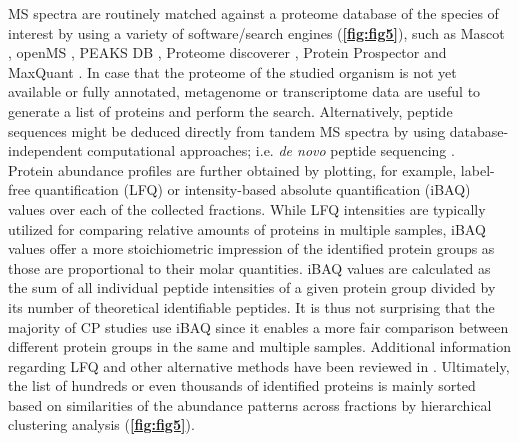 MS spectra are routinely matched against a proteome database of the species of interest by using a variety of software/search engines (\textbf{\autoref{fig:fig5}}), such as Mascot \cite{Perkins_1999}, openMS \cite{Rost_2016}, PEAKS DB \cite{Zhang_2012}, Proteome discoverer \cite{Orsburn_2021}, Protein Prospector \cite{Chalkley_2005} and MaxQuant \cite{Tyanova_2016a}. In case that the proteome of the studied organism is not yet available or fully annotated, metagenome or transcriptome data are useful to generate a list of proteins and perform the search. Alternatively, peptide sequences might be deduced directly from tandem MS spectra by using database-independent computational approaches; i.e. \emph{de novo} peptide sequencing \cite{Tran_2017}.\\
Protein abundance profiles are further obtained by plotting, for example, label-free quantification (LFQ) \cite{Cox_2014} or intensity-based absolute quantification (iBAQ) \cite{Schwanhausser_2011, Tyanova_2016a} values over each of the collected fractions. While LFQ intensities are typically utilized for comparing relative amounts of proteins in multiple samples, iBAQ values offer a more stoichiometric impression of the identified protein groups as those are proportional to their molar quantities. iBAQ values are calculated as the sum of all individual peptide intensities of a given protein group divided by its number of theoretical identifiable peptides. It is thus not surprising that the majority of CP studies use iBAQ since it enables a more fair comparison between different protein groups in the same and multiple samples. Additional information regarding LFQ and other alternative methods have been reviewed in \cite{Fabre_2014, Wittig_2021}. Ultimately, the list of hundreds or even thousands of identified proteins is mainly sorted based on similarities of the abundance patterns across fractions by hierarchical clustering analysis (\textbf{\autoref{fig:fig5}}). \clearpage

